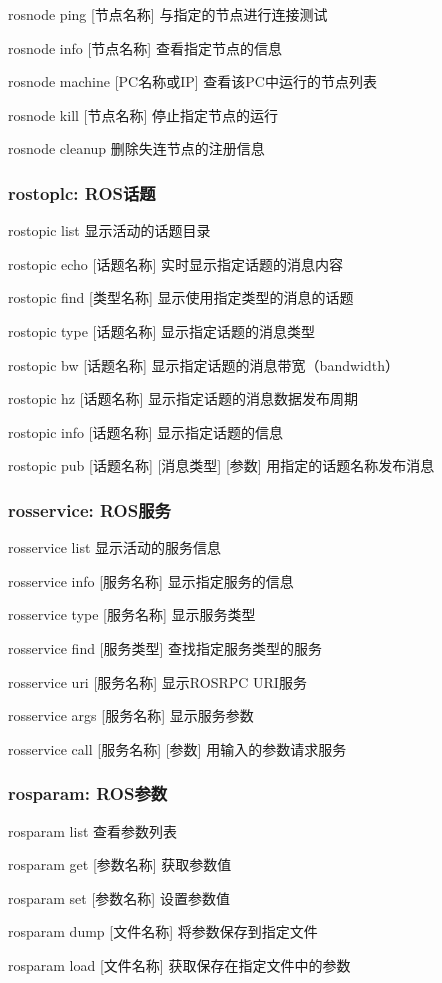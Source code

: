 \documentclass[geye,green,kindle,cn]{elegantnote}
\begin{document}
rosnode ping [节点名称] 与指定的节点进行连接测试

rosnode info [节点名称] 查看指定节点的信息 

rosnode machine [PC名称或IP] 查看该PC中运行的节点列表 

rosnode kill [节点名称] 停止指定节点的运行 

rosnode cleanup 删除失连节点的注册信息 
\subsubsection{rostoplc: ROS话题}
rostopic list 显示活动的话题目录 

rostopic echo [话题名称] 实时显示指定话题的消息内容 

rostopic find [类型名称] 显示使用指定类型的消息的话题

rostopic type [话题名称] 显示指定话题的消息类型 

rostopic bw [话题名称] 显示指定话题的消息带宽（bandwidth） 

rostopic hz [话题名称] 显示指定话题的消息数据发布周期 

rostopic info [话题名称] 显示指定话题的信息 

rostopic pub [话题名称] [消息类型] [参数] 用指定的话题名称发布消息
\subsubsection{rosservice: ROS服务}
rosservice list 显示活动的服务信息 

rosservice info [服务名称] 显示指定服务的信息 

rosservice type [服务名称] 显示服务类型 

rosservice find [服务类型] 查找指定服务类型的服务 

rosservice uri [服务名称] 显示ROSRPC URI服务 

rosservice args [服务名称] 显示服务参数 

rosservice call [服务名称] [参数] 用输入的参数请求服务 
\subsubsection{rosparam: ROS参数}
rosparam list 查看参数列表 

rosparam get [参数名称] 获取参数值 

rosparam set [参数名称] 设置参数值 

rosparam dump [文件名称] 将参数保存到指定文件 

rosparam load [文件名称] 获取保存在指定文件中的参数 
\end{document}
